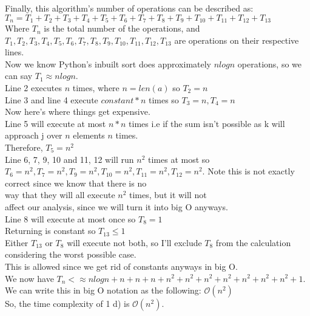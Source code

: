 \documentclass[12pt]{article}
\begin{document}
Finally, this algorithm's number of operations can be described as:\\
$T_n = T_1 + T_2 + T_3 + T_4 + T_5 + T_6 + T_7 + T_8 + T_9 + T_{10} + T_{11} + T_{12} + T_{13}$\\
Where $T_n$ is the total number of the operations, and $T_1,T_2,T_3,T_4,T_5,T_6,T_7,T_8,T_9,T_{10},T_{11},T_{12},T_{13}$ are operations on their respective lines.\\
Now we know Python's inbuilt sort does approximately $nlogn$ operations, so we can say $T_1 \approx nlogn$.\\
Line 2 executes $n$ times, where $n=len(a)$ so $T_2 = n$\\
Line 3 and line 4 execute $constant*n$ times so $T_3 = n, T_4 = n$ \\
Now here's where things get expensive.\\
Line 5 will execute at most $n*n$ times i.e if the sum isn't possible as k will approach j over $n$ elements $n$ times.\\ Therefore, $T_5 = n^2$\\
Line 6, 7, 9, 10 and 11, 12 will run $n^2$ times at most so $T_6 = n^2, T_7 = n^2, T_9 = n^2, T_{10} = n^2, T_{11} = n^2, T_{12} = n^2 $. 
Note this is not exactly correct since we know that there is no\\ way that they will all execute $n^2$ times, but it will not\\
affect our analysis, since we will turn it into big O anyways.\\
Line 8 will execute at most once so $T_8 = 1$\\
Returning is constant so $T_{13} \leq 1$\\
Either $T_{13}$ or $T_8$ will execute not both, so I'll exclude $T_8$ from the calculation considering the worst possible case.\\ This is allowed since we get rid of constants anyways in big O.\\
We now have $T_n < \approx nlogn + n + n + n + n^2 + n^2 + n^2 + n^2 + n^2 + n^2 + n^2 + 1$.
We can write this in big O notation as the following:
$\mathcal{O}(n^2)$\\
So, the time complexity of 1 d) is $\mathcal{O}(n^2)$.
\end{document}
